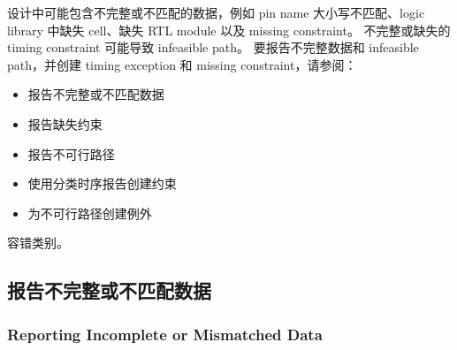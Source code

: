 设计中可能包含不完整或不匹配的数据，例如 pin name 大小写不匹配、logic library 中缺失 cell、缺失 RTL module 以及 missing constraint。
不完整或缺失的 timing constraint 可能导致 infeasible path。
要报告不完整数据和 infeasible path，并创建 timing exception 和 missing constraint，请参阅：
\begin{itemize}
  \item 报告不完整或不匹配数据
  \item 报告缺失约束
  \item 报告不可行路径
  \item 使用分类时序报告创建约束
  \item 为不可行路径创建例外
\end{itemize}

\begin{seeAlsoBox}
容错类别。
\end{seeAlsoBox}

\subsection{报告不完整或不匹配数据}
\subsubsection*{Reporting Incomplete or Mismatched Data}

